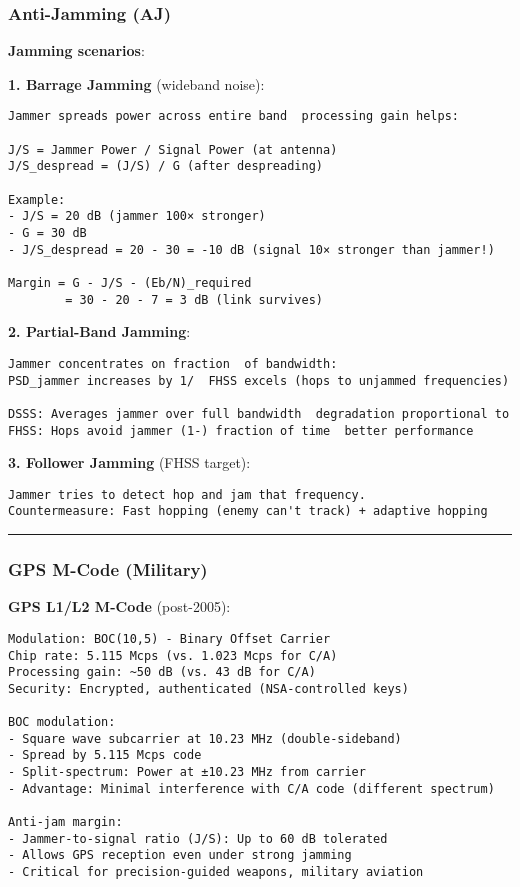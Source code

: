 \subsubsection{Anti-Jamming (AJ)}\label{anti-jamming-aj}

\textbf{Jamming scenarios}:

\textbf{1. Barrage Jamming} (wideband noise):

\begin{verbatim}
Jammer spreads power across entire band  processing gain helps:

J/S = Jammer Power / Signal Power (at antenna)
J/S_despread = (J/S) / G (after despreading)

Example:
- J/S = 20 dB (jammer 100× stronger)
- G = 30 dB
- J/S_despread = 20 - 30 = -10 dB (signal 10× stronger than jammer!)

Margin = G - J/S - (Eb/N)_required
        = 30 - 20 - 7 = 3 dB (link survives)
\end{verbatim}

\textbf{2. Partial-Band Jamming}:

\begin{verbatim}
Jammer concentrates on fraction  of bandwidth:
PSD_jammer increases by 1/  FHSS excels (hops to unjammed frequencies)

DSSS: Averages jammer over full bandwidth  degradation proportional to 
FHSS: Hops avoid jammer (1-) fraction of time  better performance
\end{verbatim}

\textbf{3. Follower Jamming} (FHSS target):

\begin{verbatim}
Jammer tries to detect hop and jam that frequency.
Countermeasure: Fast hopping (enemy can't track) + adaptive hopping
\end{verbatim}

\begin{center}\rule{0.5\linewidth}{0.5pt}\end{center}

\subsubsection{GPS M-Code (Military)}\label{gps-m-code-military}

\textbf{GPS L1/L2 M-Code} (post-2005):

\begin{verbatim}
Modulation: BOC(10,5) - Binary Offset Carrier
Chip rate: 5.115 Mcps (vs. 1.023 Mcps for C/A)
Processing gain: ~50 dB (vs. 43 dB for C/A)
Security: Encrypted, authenticated (NSA-controlled keys)

BOC modulation:
- Square wave subcarrier at 10.23 MHz (double-sideband)
- Spread by 5.115 Mcps code
- Split-spectrum: Power at ±10.23 MHz from carrier
- Advantage: Minimal interference with C/A code (different spectrum)

Anti-jam margin:
- Jammer-to-signal ratio (J/S): Up to 60 dB tolerated
- Allows GPS reception even under strong jamming
- Critical for precision-guided weapons, military aviation
\end{verbatim}

